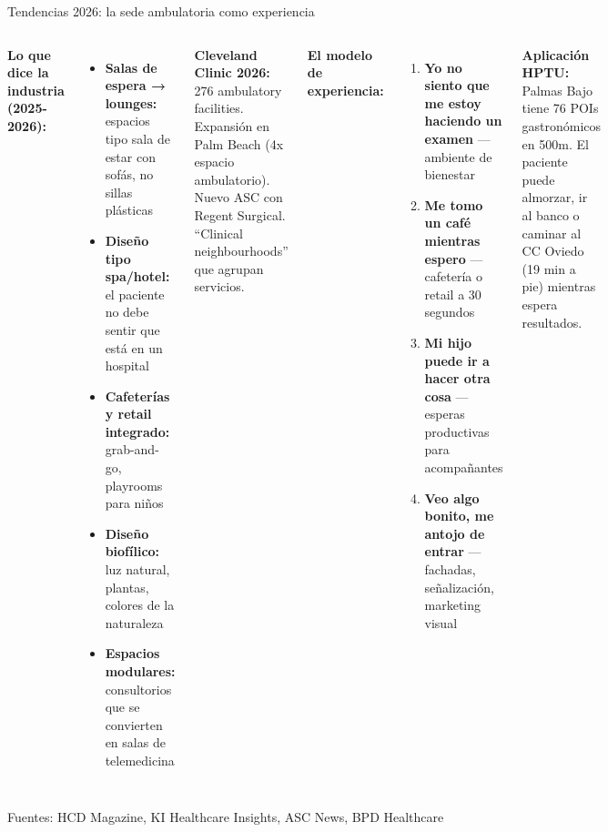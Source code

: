 \documentclass[aspectratio=169, 11pt]{beamer}
\begin{document}
\begin{frame}{Tendencias 2026: la sede ambulatoria como experiencia}

\begin{columns}[T]
\vspace{2pt}
{\scriptsize\textbf{Lo que dice la industria (2025-2026):}}
\vspace{2pt}

{\scriptsize
\begin{itemize}\setlength{\itemsep}{2pt}
  \item \textbf{Salas de espera → lounges:} espacios tipo sala de estar con sofás, no sillas plásticas
  \item \textbf{Diseño tipo spa/hotel:} el paciente no debe sentir que está en un hospital
  \item \textbf{Cafeterías y retail integrado:} grab-and-go, playrooms para niños
  \item \textbf{Diseño biofílico:} luz natural, plantas, colores de la naturaleza
  \item \textbf{Espacios modulares:} consultorios que se convierten en salas de telemedicina
\end{itemize}
}

\vspace{3pt}
{\scriptsize\textbf{Cleveland Clinic 2026:}\\
276 ambulatory facilities. Expansión en Palm Beach (4x espacio ambulatorio). Nuevo ASC con Regent Surgical. ``Clinical neighbourhoods'' que agrupan servicios.}

\vspace{2pt}
{\scriptsize\textbf{El modelo de experiencia:}}
\vspace{2pt}

{\scriptsize
\begin{enumerate}\setlength{\itemsep}{3pt}
  \item \textbf{Yo no siento que me estoy haciendo un examen} --- ambiente de bienestar
  \item \textbf{Me tomo un café mientras espero} --- cafetería o retail a 30 segundos
  \item \textbf{Mi hijo puede ir a hacer otra cosa} --- esperas productivas para acompañantes
  \item \textbf{Veo algo bonito, me antojo de entrar} --- fachadas, señalización, marketing visual
\end{enumerate}
}

\vspace{4pt}
{\scriptsize\textcolor{hptu}{\textbf{Aplicación HPTU:} Palmas Bajo tiene 76 POIs gastronómicos en 500m. El paciente puede almorzar, ir al banco o caminar al CC Oviedo (19 min a pie) mientras espera resultados.}}
\end{columns}

{\tiny\color{slate} Fuentes: HCD Magazine, KI Healthcare Insights, ASC News, BPD Healthcare}
\end{frame}
\end{document}
